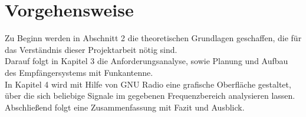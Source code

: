 \section{Vorgehensweise}
Zu Beginn werden in Abschnitt 2 die theoretischen Grundlagen geschaffen, die für das Verständnis dieser Projektarbeit nötig sind. \\
Darauf folgt in Kapitel 3 die Anforderungsanalyse, sowie Planung und Aufbau des Empfängersystems mit Funkantenne.\\
In Kapitel 4 wird mit Hilfe von GNU Radio eine grafische Oberfläche gestaltet, über die sich beliebige Signale im gegebenen Frequenzbereich analysieren lassen.\\
Abschließend folgt eine Zusammenfassung mit Fazit und Ausblick.










